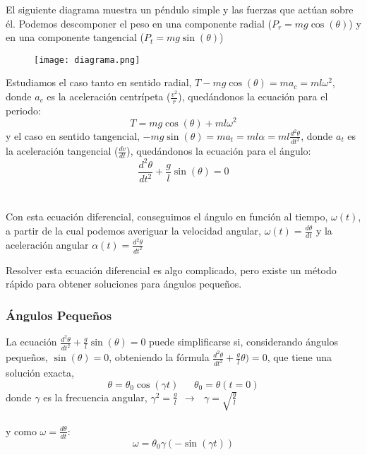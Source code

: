 \documentclass{article}
\begin{document}
El siguiente diagrama muestra un péndulo simple y las fuerzas que actúan sobre él. Podemos descomponer el peso en una componente radial ($P_{r} = m g \cos(\theta) $) y en una componente tangencial ($P_{t} = m g \sin(\theta) $)

\begin{figure}[h]
\centering
\texttt{[image: diagrama.png]}
\end{figure}

Estudiamos el caso tanto en sentido radial, $ T - m g \cos(\theta) = m a_{c} = m l \omega^{2}$, donde $a_{c}$ es la aceleración centrípeta ($\frac{v^{2}}{r}$), quedándonos la ecuación para el periodo: \[ \boxed{T = m g \cos(\theta) + m l \omega^{2}}\] y el caso en sentido tangencial, $ -m g \sin(\theta) = m a_{t} = m l \alpha = m l \frac{d^{2}\theta}{dt^{2}}$, donde $a_{t}$ es la aceleración tangencial ($\frac{dv}{dt}$), quedándonos la ecuación para el ángulo: \[\boxed{\frac{d^{2}\theta}{dt^{2}} + \frac{g}{l} \sin(\theta) = 0}\] \\\\ Con esta ecuación diferencial, conseguimos el ángulo en función al tiempo, $ \omega(t)$, a partir de la cual podemos averiguar la velocidad angular, $\omega(t) = \frac{d\theta}{dt}$ y la aceleración angular $\alpha(t) = \frac{d^{2}\theta}{dt^{2}}$

Resolver esta ecuación diferencial es algo complicado, pero existe un método rápido para obtener soluciones para ángulos pequeños.

\subsubsection{Ángulos Pequeños}
La ecuación $\frac{d^{2}\theta}{dt^{2}} + \frac{g}{l} \sin(\theta) = 0$ puede simplificarse si, considerando ángulos pequeños, $\sin(\theta) = 0$, obteniendo la fórmula $\frac{d^{2}\theta}{dt^{2}} + \frac{g}{l} \theta) = 0$, que tiene una solución exacta, \[ \boxed{\theta = \theta_0 \cos(\gamma t)\ \ \ \ \ \ \ \theta_0 = \theta (t = 0)}\] donde $\gamma$ es la frecuencia angular, $\gamma^{2} = \frac{g}{l} \ \ \longrightarrow\ \ \ \gamma = \sqrt{\frac{g}{l}}$\\\\
y como $\omega = \frac{d\theta}{dt}$: \[\boxed{\omega = \theta_0 \gamma \left(-\sin(\gamma t)\right)} \]
\end{document}
